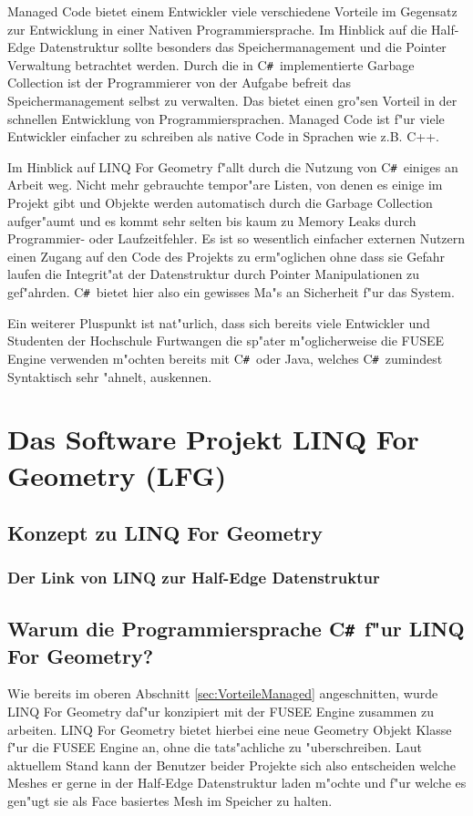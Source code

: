 \documentclass[pagesize, paper=a4, fontsize=12pt,titlepage=true, headings=small, headnosepline, abstractoff, liststotoc, nochapterprefix, plainheadsepline]{scrreprt}
\newcommand{\CSS}{C\texttt{\# }}
\newcommand{\LFG}{LINQ For Geometry}
\newcommand{\LFGS}{LINQ For Geometry }
\newcommand{\HES}{Half-Edge Datenstruktur }
\begin{document}
		Managed Code bietet einem Entwickler viele verschiedene Vorteile im Gegensatz zur Entwicklung in einer Nativen Programmiersprache. Im Hinblick auf die \HES sollte besonders das Speichermanagement und die Pointer Verwaltung betrachtet werden. Durch die in \CSS implementierte Garbage Collection ist der Programmierer von der Aufgabe befreit das Speichermanagement selbst zu verwalten. Das bietet einen gro"sen Vorteil in der schnellen Entwicklung von Programmiersprachen. Managed Code ist f"ur viele Entwickler einfacher zu schreiben als native Code in Sprachen wie z.B. C++.

Im Hinblick auf \LFGS f"allt durch die Nutzung von \CSS einiges an Arbeit weg. Nicht mehr gebrauchte tempor"are Listen, von denen es einige im Projekt gibt und Objekte werden automatisch durch die Garbage Collection aufger"aumt und es kommt sehr selten bis kaum zu Memory Leaks durch Programmier- oder Laufzeitfehler. Es ist so wesentlich einfacher externen Nutzern einen Zugang auf den Code des Projekts zu erm"oglichen ohne dass sie Gefahr laufen die Integrit"at der Datenstruktur durch Pointer Manipulationen zu gef"ahrden. \CSS bietet hier also ein gewisses Ma"s an Sicherheit f"ur das System.

Ein weiterer Pluspunkt ist nat"urlich, dass sich bereits viele Entwickler und Studenten der Hochschule Furtwangen die sp"ater m"oglicherweise die FUSEE Engine verwenden m"ochten bereits mit \CSS oder Java, welches \CSS zumindest Syntaktisch sehr "ahnelt, auskennen.
	\section {Das Software Projekt LINQ For Geometry (LFG)}
		\subsection {Konzept zu \LFG}
			\subsubsection {Der Link von LINQ zur \HES}
		\subsection {Warum die Programmiersprache \CSS f"ur \LFG?}
			Wie bereits  im oberen Abschnitt \ref{sec:VorteileManaged} angeschnitten, wurde \LFGS daf"ur konzipiert mit der FUSEE Engine zusammen zu arbeiten. \LFGS bietet hierbei eine neue Geometry Objekt Klasse f"ur die FUSEE Engine an, ohne die tats"achliche zu "uberschreiben. Laut aktuellem Stand kann der Benutzer beider Projekte sich also entscheiden welche Meshes er gerne in der \HES laden m"ochte und f"ur welche es gen"ugt sie als Face basiertes Mesh im Speicher zu halten.
\end{document}
